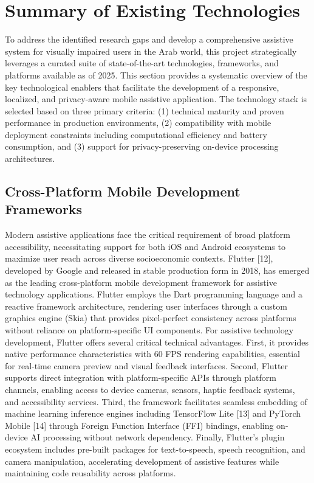 \documentclass[a4paper]{report}
\begin{document}
\section{Summary of Existing Technologies}

To address the identified research gaps and develop a comprehensive assistive system for visually impaired users in the Arab world, this project strategically leverages a curated suite of state-of-the-art technologies, frameworks, and platforms available as of 2025. This section provides a systematic overview of the key technological enablers that facilitate the development of a responsive, localized, and privacy-aware mobile assistive application. The technology stack is selected based on three primary criteria: (1) technical maturity and proven performance in production environments, (2) compatibility with mobile deployment constraints including computational efficiency and battery consumption, and (3) support for privacy-preserving on-device processing architectures.

\subsection{Cross-Platform Mobile Development Frameworks}

Modern assistive applications face the critical requirement of broad platform accessibility, necessitating support for both iOS and Android ecosystems to maximize user reach across diverse socioeconomic contexts. Flutter [12], developed by Google and released in stable production form in 2018, has emerged as the leading cross-platform mobile development framework for assistive technology applications. Flutter employs the Dart programming language and a reactive framework architecture, rendering user interfaces through a custom graphics engine (Skia) that provides pixel-perfect consistency across platforms without reliance on platform-specific UI components. For assistive technology development, Flutter offers several critical technical advantages. First, it provides native performance characteristics with 60 FPS rendering capabilities, essential for real-time camera preview and visual feedback interfaces. Second, Flutter supports direct integration with platform-specific APIs through platform channels, enabling access to device cameras, sensors, haptic feedback systems, and accessibility services. Third, the framework facilitates seamless embedding of machine learning inference engines including TensorFlow Lite [13] and PyTorch Mobile [14] through Foreign Function Interface (FFI) bindings, enabling on-device AI processing without network dependency. Finally, Flutter's plugin ecosystem includes pre-built packages for text-to-speech, speech recognition, and camera manipulation, accelerating development of assistive features while maintaining code reusability across platforms.
\end{document}
